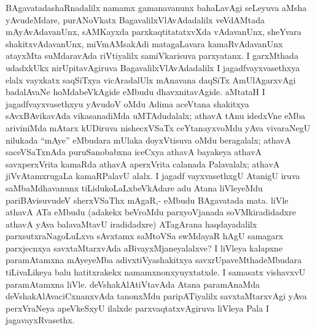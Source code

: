 BAgavatadashaRnadalilx namamx gamanavanunx bahaLavAgi seLeyuva aMsha yAvu\-deMdare, purANoVkatx BagavalilxVlAvAdadalilx veVdAMtada mAyAvAdavanUnx, sAMKayxda parxkaqtitatatxvXda vAdavanUnx, sheYvara shakitxvAdavanUnx, miVmAMsakAdi matagaLavara kamaRvAdavanUnx atayxMta suMdaravAda riVtiyalilx samiVkarisuva parxyatanx. I garxMthada udadxkUkx nirUpitavAgiruva BagavalilxVlAvAdadalilx I jagadfvayxvasethxya elalx vayxkatx saqSiTxya vicAradalUlx mAnavana daqSiTx AmUlAgarxvAgi badalAvaNe hoMdabeVkAgide eMbudu dhavxnitavAgide. aMtataH I jagadfvayxvasethxyu yAvudoV oMdu Adima aceVtana shakitxya sAvxBAvikavAda vikasanadiMda uMTAdudalalx; athavA tAnu idedxVne eMba ariviniMda mAtarx kUDiruva nishecxVSaTx ceYtanayxvoMdu yAva vivaraNegU nilukada ``mAye'' eMbudara mUlaka doyxVtisuva oMdu beragalalx; athavA saceVSaTxnAda puruSanobabxna iceCxya athavA bayakeya athavA savxperxVrita kamaRda athavA aperxVrita calanada Palavalalx; athavA jiVvAtamxrugaLa kamaRPalavU alalx. I jagadf vayxvasethxgU AtanigU iruva saMbaMdhavanunx tiLidukoLaLxbeVkAdare adu Atana liVleyeMdu pariBAvisuvudeV sherxVSaThx mAgaR,- eMbudu BAgavatada mata. liVle athavA ATa eMbudu (adakekx beVroMdu parxyoVjanada soVMkiradidadxre athavA yAva balavaMtavU iradidadxre) ATagArana haqdayadalilx parxsutxraNagoLuLxva sAvxtamx saMtoVSa swMdayaR hAgU samagarx parxjecnxya savxtaMtarxvAda aBivayxMjaneyalalxve? I liVleya kalapxne paramAtamxna mAyeyeMba adivxtiVyashakitxya savxrUpaveMthadeMbudara tiLivaLikeya balu hatitxrakekx namamxnonxyuyxtatxde. I samasatx vishavxvU paramAtamxna liVle. deVshakAlAtiVtavAda Atana paramAnaMda deVshakAlAvaciCxnanxvAda tanonxMdu paripATiyalilx savxtaMtarxvAgi yAva perxVraNeya apeVkeSxyU ilalxde parxvaqtatxvAgiruva liVleya Pala I jagavayxRvasethx.

